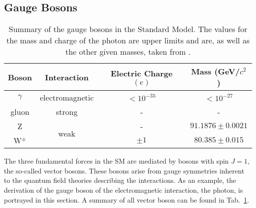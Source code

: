 \subsection{Gauge Bosons}
\label{subsec:theo:bosons}
\begin{table}[b]
	\centering
	\caption[Summary of the gauge bosons in the Standard Model]{Summary of the gauge bosons in the Standard Model. The values for the mass and charge of the photon are upper limits and are, as well as the other given masses, taken from \cite{SMmasses}.}
	\label{tab:theo:bosons}
	\begin{tabular}{cccc}
	\hline
	Boson & Interaction & Electric Charge $(e)$ & Mass (GeV/$c^2$) \\
	\hline
	$\gamma$ & electromagnetic & $<10^{-35}$ & $<10^{-27}$ \\
	gluon & strong & - & - \\
	Z & \multirow{2}{*}{weak} & - & $91.1876 \pm 0.0021$ \\
	W$^\pm$ & & $\pm 1$ & $80.385 \pm 0.015$ \\
	\hline
	\end{tabular}
\end{table}
The three fundamental forces in the SM are mediated by bosons with spin $J=1$, the so-called vector bosons. These bosons arise from gauge symmetries inherent to the quantum field theories describing the interactions. As an example, the derivation of the gauge boson of the electromagnetic interaction, the photon, is portrayed in this section. A summary of all vector boson can be found in Tab.~\ref{tab:theo:bosons}.\\

